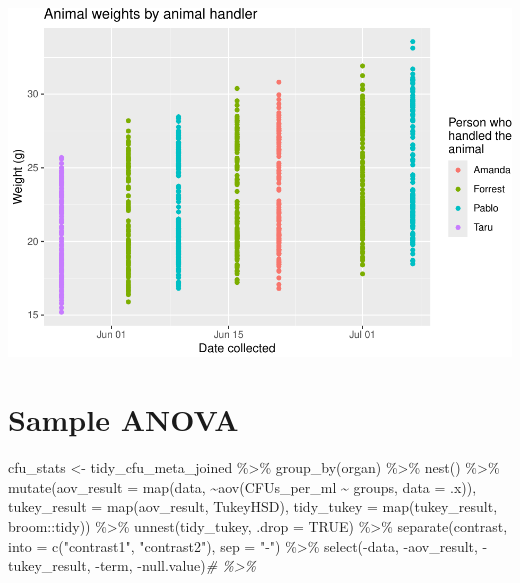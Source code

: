 \documentclass[
]{book}
\newenvironment{Shaded}{\begin{snugshade}}{\end{snugshade}}
\newcommand{\AttributeTok}[1]{\textcolor[rgb]{0.77,0.63,0.00}{#1}}
\newcommand{\CommentTok}[1]{\textcolor[rgb]{0.56,0.35,0.01}{\textit{#1}}}
\newcommand{\ConstantTok}[1]{\textcolor[rgb]{0.00,0.00,0.00}{#1}}
\newcommand{\FunctionTok}[1]{\textcolor[rgb]{0.00,0.00,0.00}{#1}}
\newcommand{\NormalTok}[1]{#1}
\newcommand{\OtherTok}[1]{\textcolor[rgb]{0.56,0.35,0.01}{#1}}
\newcommand{\SpecialCharTok}[1]{\textcolor[rgb]{0.00,0.00,0.00}{#1}}
\newcommand{\StringTok}[1]{\textcolor[rgb]{0.31,0.60,0.02}{#1}}
\begin{document}
\includegraphics{csu-impactb_files/figure-latex/unnamed-chunk-17-1.pdf}

\hypertarget{sample-anova}{%
\section{Sample ANOVA}\label{sample-anova}}

\begin{Shaded}
\begin{Highlighting}[]
\NormalTok{cfu\_stats }\OtherTok{\textless{}{-}}\NormalTok{ tidy\_cfu\_meta\_joined }\SpecialCharTok{\%\textgreater{}\%} 
  \FunctionTok{group\_by}\NormalTok{(organ) }\SpecialCharTok{\%\textgreater{}\%}
  \FunctionTok{nest}\NormalTok{() }\SpecialCharTok{\%\textgreater{}\%}
  \FunctionTok{mutate}\NormalTok{(}\AttributeTok{aov\_result =} \FunctionTok{map}\NormalTok{(data, }\SpecialCharTok{\textasciitilde{}}\FunctionTok{aov}\NormalTok{(CFUs\_per\_ml }\SpecialCharTok{\textasciitilde{}}\NormalTok{ groups, }\AttributeTok{data =}\NormalTok{ .x)),}
         \AttributeTok{tukey\_result =} \FunctionTok{map}\NormalTok{(aov\_result, TukeyHSD),}
         \AttributeTok{tidy\_tukey =} \FunctionTok{map}\NormalTok{(tukey\_result, broom}\SpecialCharTok{::}\NormalTok{tidy)) }\SpecialCharTok{\%\textgreater{}\%}
  \FunctionTok{unnest}\NormalTok{(tidy\_tukey, }\AttributeTok{.drop =} \ConstantTok{TRUE}\NormalTok{) }\SpecialCharTok{\%\textgreater{}\%}
  \FunctionTok{separate}\NormalTok{(contrast, }\AttributeTok{into =} \FunctionTok{c}\NormalTok{(}\StringTok{"contrast1"}\NormalTok{, }\StringTok{"contrast2"}\NormalTok{), }\AttributeTok{sep =} \StringTok{"{-}"}\NormalTok{) }\SpecialCharTok{\%\textgreater{}\%}
  \FunctionTok{select}\NormalTok{(}\SpecialCharTok{{-}}\NormalTok{data, }\SpecialCharTok{{-}}\NormalTok{aov\_result, }\SpecialCharTok{{-}}\NormalTok{tukey\_result, }\SpecialCharTok{{-}}\NormalTok{term, }\SpecialCharTok{{-}}\NormalTok{null.value)}\CommentTok{\# \%\textgreater{}\%}
\end{Highlighting}
\end{Shaded}
\end{document}
